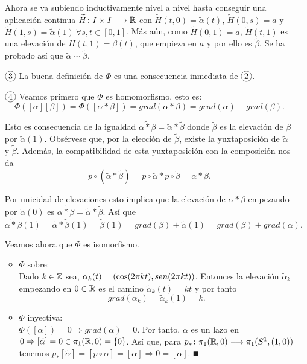 \documentclass[GTS.tex]{subfiles}
\begin{document}
\begin{dem}
\begin{enumerate}
Ahora se va subiendo inductivamente nivel a nivel hasta conseguir una aplicación continua $\widetilde{H}\colon{I\times I}\longrightarrow{\mathbb{R}}$ con $\widetilde{H}(t,0)=\tilde{\alpha}(t)$, $\widetilde{H}(0,s)=a$ y $\widetilde{H}(1,s)=\tilde{\alpha}(1)\ \forall s,t\in[0,1]$. Más aún, como
$\widetilde{H}(0,1)=a$, $\widetilde{H}(t,1)$ es una elevación de $H(t,1)=\beta(t)$, que empieza en $a$ y por ello es $\tilde{\beta}$. Se ha probado así que $\tilde{\alpha}\sim\tilde{\beta}$.

\item[$\circled{3}$] La buena definición de $\Phi$ es una consecuencia inmediata de $\circled{2}$.

\item[$\circled{4}$] Veamos primero que $\Phi$ es homomorfismo, esto es:
\[
\Phi([\alpha][\beta])=\Phi([\alpha*\beta])=grad(\alpha*\beta)=grad(\alpha)+grad(\beta).
\]

Esto es consecuencia de la igualdad $\widetilde{\alpha*\beta}=\tilde{\alpha}*\tilde{\beta}$ donde $\tilde{\beta}$ es la elevación de $\beta$ por $\tilde{\alpha}(1)$. Obsérvese que, por la elección de $\tilde{\beta}$, existe la yuxtaposición de $\tilde{\alpha}$ y $\tilde{\beta}$. Además, la compatibilidad de esta yuxtaposición con la composición nos da
\[
p\circ(\tilde{\alpha}*\tilde{\beta})=p\circ\tilde{\alpha}*p\circ\tilde{\beta}=\alpha*\beta.
\]

Por unicidad de elevaciones esto implica que la elevación de $\alpha*\beta$ empezando por $\tilde{\alpha}(0)$ es $\widetilde{\alpha*\beta}=\tilde{\alpha}*\tilde{\beta}$. Así que
\[
\widetilde{\alpha*\beta}(1)=\tilde{\alpha}*\tilde{\beta}(1)=\tilde{\beta}(1)=grad(\beta)+\tilde{\alpha}(1)=grad(\beta)+grad(\alpha).
\]


Veamos ahora que $\Phi$ es isomorfismo.
\begin{itemize}
\item $\Phi$ sobre:\\
Dado $k\in\mathbb{Z}$ sea, $\alpha_k(t)=(\cos(2\pi kt),sen (2\pi kt))$. Entonces la elevación $\tilde{\alpha}_k$ empezando en $0\in\mathbb{R}$ es el camino $\tilde{\alpha}_k(t)=k t$ y por tanto
\[
grad(\alpha_k)=\tilde{\alpha}_k(1)=k.
\]

\item $\Phi$ inyectiva:\\
$\Phi([\alpha])=0\Rightarrow grad(\alpha)=0$. Por tanto, $\tilde{\alpha}$ es un lazo en $0\Rightarrow [\tilde{\alpha}]=0\in\pi_1(\mathbb{R},0)=\{0\}$. Así que, para $p_*\colon{\pi_1(\mathbb{R},0)}\longrightarrow{\pi_1(S^1,(1,0))}$ tenemos $p_*[\tilde{\alpha}]=[p\circ\tilde{\alpha}]=[\alpha]\Rightarrow 0=[\alpha]$. $\QED$
\end{itemize}
\end{enumerate}
\end{dem}
\end{document}

